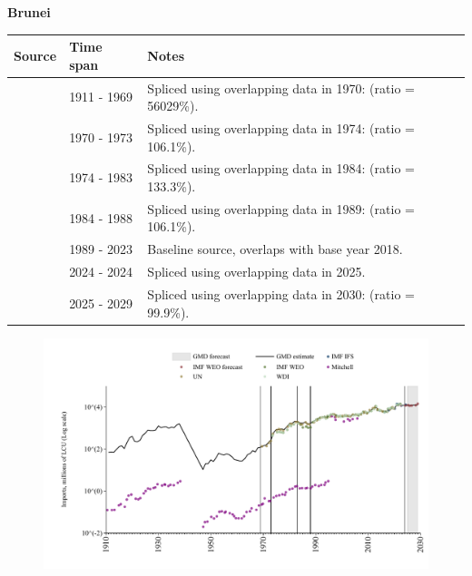 \documentclass[12pt,a4paper,landscape]{article}
\begin{document}
\begin{adjustbox}{max totalsize={\paperwidth}{\paperheight},center}
\begin{minipage}[t][\textheight][t]{\textwidth}
\vspace*{0.5cm}
{}
\begin{center}
{\Large\bfseries Brunei}
\end{center}
\vspace{0.5cm}
\begin{table}[H]
\centering
\small
\begin{tabular}{|l|l|l|}
\hline
\textbf{Source} & \textbf{Time span} & \textbf{Notes} \\
\hline
\rowcolor{white}\cite{Mitchell}& 1911 - 1969 &Spliced using overlapping data in 1970: (ratio = 56029\%).\\
\rowcolor{lightgray}\cite{UN}& 1970 - 1973 &Spliced using overlapping data in 1974: (ratio = 106.1\%).\\
\rowcolor{white}\cite{WDI}& 1974 - 1983 &Spliced using overlapping data in 1984: (ratio = 133.3\%).\\
\rowcolor{lightgray}\cite{UN}& 1984 - 1988 &Spliced using overlapping data in 1989: (ratio = 106.1\%).\\
\rowcolor{white}\cite{WDI}& 1989 - 2023 &Baseline source, overlaps with base year 2018.\\
\rowcolor{lightgray}\cite{IMF_IFS}& 2024 - 2024 &Spliced using overlapping data in 2025.\\
\rowcolor{white}\cite{IMF_WEO_forecast}& 2025 - 2029 &Spliced using overlapping data in 2030: (ratio = 99.9\%).\\
\hline
\end{tabular}
\end{table}
\begin{figure}[H]
\centering
\includegraphics[width=\textwidth,height=0.6\textheight,keepaspectratio]{graphs/BRN_imports.pdf}
\end{figure}
\end{minipage}
\end{adjustbox}
\end{document}
